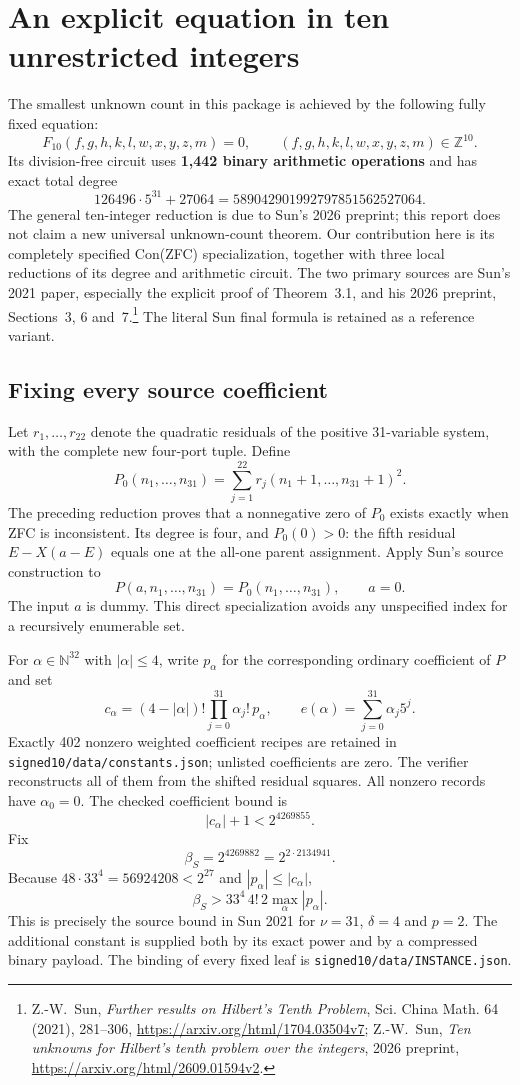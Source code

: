 \section{An explicit equation in ten unrestricted integers}
\label{sec:signed10}

The smallest unknown count in this package is achieved by the following
fully fixed equation:
\[
 F_{10}(f,g,h,k,l,w,x,y,z,m)=0,
 \qquad(f,g,h,k,l,w,x,y,z,m)\in\mathbb Z^{10}.
\]
Its division-free circuit uses \textbf{1,442 binary arithmetic operations}
and has exact total degree
\[
 126496\cdot5^{31}+27064
 =589042901992797851562527064.
\]
The general ten-integer reduction is due to Sun's 2026 preprint; this
report does not claim a new universal unknown-count theorem.  Our
contribution here is its completely specified Con(ZFC) specialization,
together with three local reductions of its degree and arithmetic circuit.
The two primary sources are Sun's 2021 paper, especially the explicit
proof of Theorem~3.1, and his 2026 preprint, Sections~3, 6 and~7.\footnote{
Z.-W.~Sun, \emph{Further results on Hilbert's Tenth Problem},
Sci. China Math. 64 (2021), 281--306,
\url{https://arxiv.org/html/1704.03504v7};
Z.-W.~Sun, \emph{Ten unknowns for Hilbert's tenth problem over the integers},
2026 preprint, \url{https://arxiv.org/html/2609.01594v2}.}
The literal Sun final formula is retained as a reference variant.

\subsection{Fixing every source coefficient}

Let $r_1,\ldots,r_{22}$ denote the quadratic residuals of the positive
31-variable system, with the complete new four-port tuple.  Define
\[
 P_0(n_1,\ldots,n_{31})
 =\sum_{j=1}^{22}r_j(n_1+1,\ldots,n_{31}+1)^2.
\]
The preceding reduction proves that a nonnegative zero of $P_0$ exists
exactly when ZFC is inconsistent.  Its degree is four, and $P_0(0)>0$:
the fifth residual $E-X(a-E)$ equals one at the all-one parent assignment.
Apply Sun's source construction to
\[
 P(a,n_1,\ldots,n_{31})=P_0(n_1,\ldots,n_{31}),\qquad a=0.
\]
The input $a$ is dummy.  This direct specialization avoids any unspecified
index for a recursively enumerable set.

For $\alpha\in\mathbb N^{32}$ with $|\alpha|\le4$, write $p_\alpha$ for
the corresponding ordinary coefficient of $P$ and set
\[
 c_\alpha=(4-|\alpha|)!\prod_{j=0}^{31}\alpha_j!\,p_\alpha,
 \qquad e(\alpha)=\sum_{j=0}^{31}\alpha_j5^j.
\]
Exactly 402 nonzero weighted coefficient recipes are retained in
\texttt{signed10/data/constants.json}; unlisted coefficients are zero.
The verifier reconstructs all of them from the shifted residual squares.
All nonzero records have $\alpha_0=0$.  The checked coefficient bound is
\[
 |c_\alpha|+1<2^{4269855}.
\]
Fix
\[
 \beta_S=2^{4269882}=2^{2\cdot2134941}.
\]
Because $48\cdot33^4=56924208<2^{27}$ and $|p_\alpha|\le|c_\alpha|$,
\[
 \beta_S>33^4\,4!\,2\max_\alpha|p_\alpha|.
\]
This is precisely the source bound in Sun 2021 for $\nu=31$, $\delta=4$
and $p=2$.  The additional constant is supplied both by its exact power
and by a compressed binary payload.  The binding of every fixed leaf is
\texttt{signed10/data/INSTANCE.json}.

